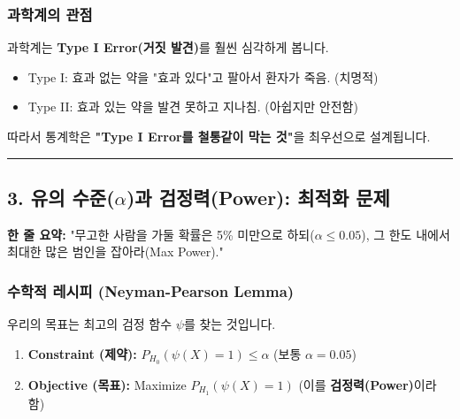 \documentclass[11pt,a4paper]{book}
\theoremstyle{definition}
\begin{document}
\subsubsection*{과학계의 관점}
과학계는 \textbf{Type I Error(거짓 발견)}를 훨씬 심각하게 봅니다.
\begin{itemize}
    \item Type I: 효과 없는 약을 "효과 있다"고 팔아서 환자가 죽음. (치명적)
    \item Type II: 효과 있는 약을 발견 못하고 지나침. (아쉽지만 안전함)
\end{itemize}
따라서 통계학은 \textbf{"Type I Error를 철통같이 막는 것"}을 최우선으로 설계됩니다.

\vspace{0.5cm}\hrule\vspace{0.5cm}

\subsection{3. 유의 수준($\alpha$)과 검정력(Power): 최적화 문제}

\begin{conceptbox}[title={개념 3: 제약 조건 하의 최적화}]
\textbf{한 줄 요약:} "무고한 사람을 가둘 확률은 5\% 미만으로 하되($\alpha \le 0.05$), 그 한도 내에서 최대한 많은 범인을 잡아라(Max Power)."
\end{conceptbox}

\subsubsection*{수학적 레시피 (Neyman-Pearson Lemma)}
우리의 목표는 최고의 검정 함수 $\psi$를 찾는 것입니다.
\begin{enumerate}
    \item \textbf{Constraint (제약):} $P_{H_0}(\psi(X)=1) \le \alpha$ (보통 $\alpha=0.05$)
    \item \textbf{Objective (목표):} Maximize $P_{H_1}(\psi(X)=1)$ (이를 \textbf{검정력(Power)}이라 함)
\end{enumerate}
\end{document}
